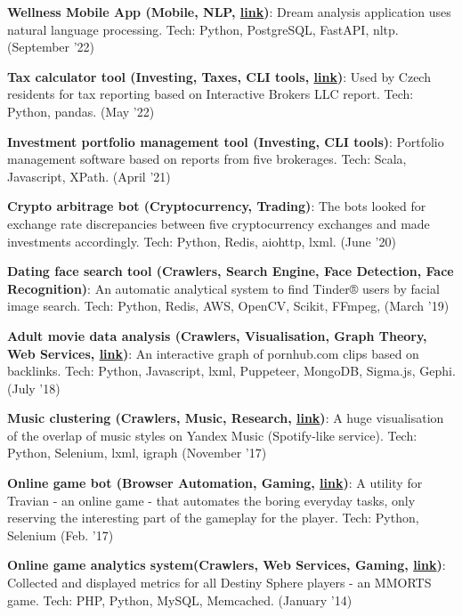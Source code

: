 \documentclass[a4paper,20pt]{article}
\newcommand{\resumeItem}[2]{
  \item\small{
    \textbf{#1}{: #2 \vspace{-2pt}}
  }
}
\newcommand{\resumeSubItem}[2]{\resumeItem{#1}{#2}\vspace{-3pt}}
\newcommand{\padding}{\vspace{1.6pt}}
\begin{document}
    \resumeSubItem{Wellness Mobile App (Mobile, NLP, \href{https://apps.apple.com/us/app/id1629296601}{link})}{Dream analysis application uses natural language processing. Tech: Python, PostgreSQL, FastAPI, nltp. (September '22)}
    \padding

    \resumeSubItem{Tax calculator tool (Investing, Taxes, CLI tools, \href{https://github.com/esemi/investments/tree/devel\#investments}{link})}{Used by Czech residents for tax reporting based on Interactive Brokers LLC report. Tech: Python, pandas. (May '22)}
    \padding

    \resumeSubItem{Investment portfolio management tool (Investing, CLI tools)}{Portfolio management software based on reports from five brokerages. Tech: Scala, Javascript, XPath. (April '21)}
    \padding

    \resumeSubItem{Crypto arbitrage bot (Cryptocurrency, Trading)}{The bots looked for exchange rate discrepancies between five cryptocurrency exchanges and made investments accordingly. Tech: Python, Redis, aiohttp, lxml. (June '20)}
    \padding

    \resumeSubItem{Dating face search tool  (Crawlers, Search Engine, Face Detection, Face Recognition)}{An automatic analytical system to find Tinder® users by facial image search. Tech: Python, Redis, AWS, OpenCV, Scikit, FFmpeg, (March '19)}
    \padding

    \resumeSubItem{Adult movie data analysis (Crawlers, Visualisation, Graph Theory, Web Services, \href{https://esemi.github.io/pornhub-graph/}{link})}{An interactive graph of pornhub.com clips based on backlinks. Tech: Python, Javascript, lxml, Puppeteer, MongoDB, Sigma.js, Gephi. (July '18)}
    \padding

    \resumeSubItem{Music clustering (Crawlers, Music, Research, \href{https://habr.com/ru/company/semrush/blog/337216/}{link})}{A huge visualisation of the overlap of music styles on Yandex Music (Spotify-like service). Tech: Python, Selenium, lxml, igraph (November '17)}
    \padding

    \resumeSubItem{Online game bot (Browser Automation, Gaming, \href{https://github.com/esemi/travian-manager\#travian-manager-bot}{link})}{A utility for Travian - an online game - that automates the boring everyday tasks, only reserving the interesting part of the gameplay for the player. Tech: Python, Selenium (Feb. '17)}
    \padding

    \resumeSubItem{Online game analytics system(Crawlers, Web Services, Gaming, \href{https://dseye.ru/}{link})}{Collected and displayed metrics for all Destiny Sphere players - an MMORTS game. Tech: PHP, Python, MySQL, Memcached. (January '14)}
\end{document}
